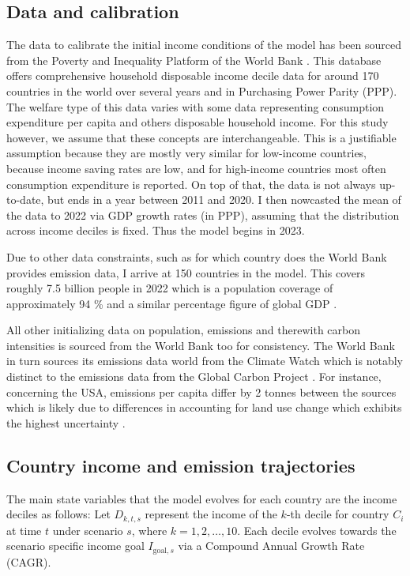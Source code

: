 \documentclass{article}
\begin{document}
\subsection{Data and calibration}

The data to calibrate the initial income conditions of the model has been sourced from the Poverty and Inequality Platform of the World Bank \parencite{pip2024}. This database offers comprehensive household disposable income decile data for around 170 countries in the world over several years and in Purchasing Power Parity (PPP). The welfare type of this data varies with some data representing consumption expenditure per capita and others disposable household income. For this study however, we assume that these concepts are interchangeable. This is a justifiable assumption because they are mostly very similar for low-income countries, because income saving rates are low, and for high-income countries most often consumption expenditure is reported. On top of that, the data is not always up-to-date, but ends in a year between 2011 and 2020. I then nowcasted the mean of the data to 2022 via GDP growth rates (in PPP), assuming that the distribution across income deciles is fixed. Thus the model begins in 2023.

Due to other data constraints, such as for which country does the World Bank provides emission data, I arrive at 150 countries in the model. This covers roughly 7.5 billion people in 2022 which is a population coverage of approximately 94 \% \parencite{owid_population2024} and a similar percentage figure of global GDP \parencite{worldbank_gdp2024}.

All other initializing data on population, emissions and therewith carbon intensities is sourced from the World Bank too for consistency. The World Bank in turn sources its emissions data world from the Climate Watch which is notably distinct to the emissions data from the Global Carbon Project \parencite{globalcarbonproject}. For instance, concerning the USA, emissions per capita differ by 2 tonnes between the sources which is likely due to differences in accounting for land use change which exhibits the highest uncertainty \parencite{climatewatch_ghg2024}.

\subsection{Country income and emission trajectories}\label{Country income and emission trajectories}

The main state variables that the model evolves for each country are the income deciles as follows: 
Let \( D_{k,t,s} \) represent the income of the \( k \)-th decile for country \( C_i \) at time \( t \) under scenario \( s \), where \( k = 1, 2, \ldots, 10 \). Each decile evolves towards the scenario specific income goal \( I_{\text{goal},s} \) via a Compound Annual Growth Rate (CAGR).
\end{document}
